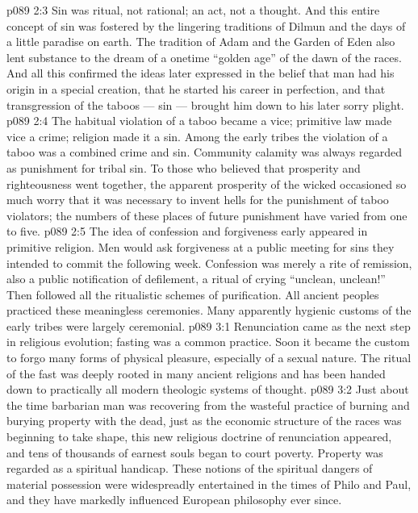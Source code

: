 \vs p089 2:3 Sin was ritual, not rational; an act, not a thought. And this entire concept of sin was fostered by the lingering traditions of Dilmun and the days of a little paradise on earth. The tradition of Adam and the Garden of Eden also lent substance to the dream of a onetime “golden age” of the dawn of the races. And all this confirmed the ideas later expressed in the belief that man had his origin in a special creation, that he started his career in perfection, and that transgression of the taboos --- sin --- brought him down to his later sorry plight.
\vs p089 2:4 The habitual violation of a taboo became a vice; primitive law made vice a crime; religion made it a sin. Among the early tribes the violation of a taboo was a combined crime and sin. Community calamity was always regarded as punishment for tribal sin. To those who believed that prosperity and righteousness went together, the apparent prosperity of the wicked occasioned so much worry that it was necessary to invent hells for the punishment of taboo violators; the numbers of these places of future punishment have varied from one to five.
\vs p089 2:5 The idea of confession and forgiveness early appeared in primitive religion. Men would ask forgiveness at a public meeting for sins they intended to commit the following week. Confession was merely a rite of remission, also a public notification of defilement, a ritual of crying “unclean, unclean!” Then followed all the ritualistic schemes of purification. All ancient peoples practiced these meaningless ceremonies. Many apparently hygienic customs of the early tribes were largely ceremonial.
\vs p089 3:1 Renunciation came as the next step in religious evolution; fasting was a common practice. Soon it became the custom to forgo many forms of physical pleasure, especially of a sexual nature. The ritual of the fast was deeply rooted in many ancient religions and has been handed down to practically all modern theologic systems of thought.
\vs p089 3:2 Just about the time barbarian man was recovering from the wasteful practice of burning and burying property with the dead, just as the economic structure of the races was beginning to take shape, this new religious doctrine of renunciation appeared, and tens of thousands of earnest souls began to court poverty. Property was regarded as a spiritual handicap. These notions of the spiritual dangers of material possession were widespreadly entertained in the times of Philo and Paul, and they have markedly influenced European philosophy ever since.
